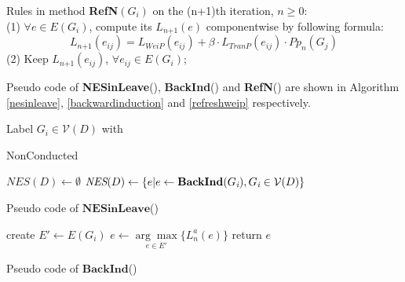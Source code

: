 \documentclass{acm_proc_article-sp}
\begin{document}
Rules in method \textbf{RefN}$(G_{\textit{i}})$ on the (n+1)th iteration, $n\geq0$:\\
(1) $\forall e\in E(G_{\textit{i}})$, compute its  $L_{\textit{n+1}}(e)$ componentwise by following formula:
$$L_{\textit{n+1}}(e_{\textit{ij}})=L_{\textit{WeiP}}(e_{\textit{ij}})+\beta \cdot L_{\textit{TranP}}(e_{\textit{ij}})\cdot Pp_{\textit{n}}(G_{\textit{j}})$$
(2) Keep $L_{\textit{n+1}}(e_{\textit{ij}})$, $\forall e_{\textit{ij}}\in E(G_{\textit{i}})$;

Pseudo code of \textbf{NESinLeave}(), \textbf{BackInd}() and \textbf{RefN}() are shown in Algorithm \ref{nesinleave}, \ref{backwardinduction} and \ref{refreshweip} respectively.
\begin{algorithm}[!h]
\scriptsize
 Label $G_{\textit{i}}\in \mathcal{V}(D)$ with \begin{bf}NonConducted\end{bf}\;
 $\textit{NES}(D)\leftarrow \emptyset$\;
 $\textit{NES}(D)\leftarrow \{e|e\leftarrow \begin{bf}BackInd\end{bf}(G_{\textit{i}}), G_{\textit{i}}\in \mathcal{V}(D)\}$\;
 \caption{Pseudo code of $\mathbf{NESinLeave}$()}
 \label{nesinleave}
\end{algorithm}

\begin{algorithm}[!h]
\scriptsize
 create $E'\leftarrow E(G_{\textit{i}})$\;
 $e\leftarrow\underset{e\in E'}{\arg\max}\{L_{\textit{n}}^a(e)\}$\;
 return $e$\;
 \caption{Pseudo code of $\mathbf{BackInd}$()}
 \label{backwardinduction}
\end{algorithm}
\end{document}
